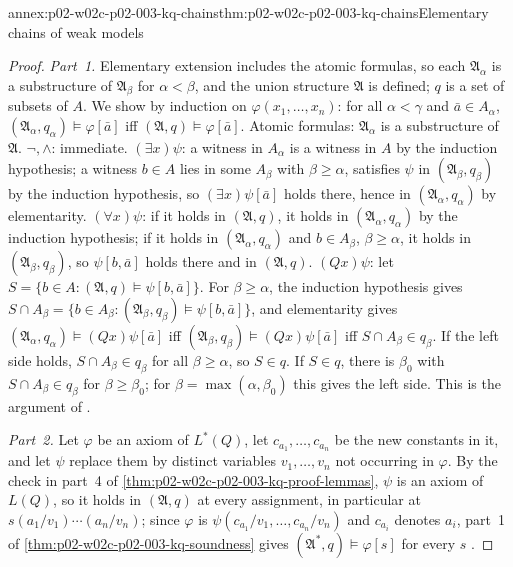 \begin{annexitem}{annex:p02-w02c-p02-003-kq-chains}{thm:p02-w02c-p02-003-kq-chains}{Elementary chains of weak models}
\begin{proof}
\emph{Part~1.}  Elementary extension includes the atomic formulas, so each
\(\mathfrak A_\alpha\) is a substructure of \(\mathfrak A_\beta\) for
\(\alpha<\beta\), and the union structure \(\mathfrak A\) is defined; \(q\)
is a set of subsets of \(A\).  We show by induction on
\(\varphi(x_1,\ldots,x_n)\): for all \(\alpha<\gamma\) and
\(\bar a\in A_\alpha\), \((\mathfrak A_\alpha,q_\alpha)\models\varphi[\bar
a]\) iff \((\mathfrak A,q)\models\varphi[\bar a]\).  Atomic formulas:
\(\mathfrak A_\alpha\) is a substructure of \(\mathfrak A\).  \(\neg,\land\):
immediate.  \((\exists x)\psi\): a witness in \(A_\alpha\) is a witness in
\(A\) by the induction hypothesis; a witness \(b\in A\) lies in some
\(A_\beta\) with \(\beta\ge\alpha\), satisfies \(\psi\) in
\((\mathfrak A_\beta,q_\beta)\) by the induction hypothesis, so
\((\exists x)\psi[\bar a]\) holds there, hence in
\((\mathfrak A_\alpha,q_\alpha)\) by elementarity.  \((\forall x)\psi\):
if it holds in \((\mathfrak A,q)\), it holds in
\((\mathfrak A_\alpha,q_\alpha)\) by the induction hypothesis; if it holds
in \((\mathfrak A_\alpha,q_\alpha)\) and \(b\in A_\beta\), \(\beta\ge\alpha\),
it holds in \((\mathfrak A_\beta,q_\beta)\), so \(\psi[b,\bar a]\) holds
there and in \((\mathfrak A,q)\).  \((Qx)\psi\): let
\(S=\{b\in A:(\mathfrak A,q)\models\psi[b,\bar a]\}\).  For
\(\beta\ge\alpha\), the induction hypothesis gives
\(S\cap A_\beta=\{b\in A_\beta:(\mathfrak A_\beta,q_\beta)\models\psi[b,\bar
a]\}\), and elementarity gives
\((\mathfrak A_\alpha,q_\alpha)\models(Qx)\psi[\bar a]\) iff
\((\mathfrak A_\beta,q_\beta)\models(Qx)\psi[\bar a]\) iff
\(S\cap A_\beta\in q_\beta\).  If the left side holds, \(S\cap A_\beta\in
q_\beta\) for all \(\beta\ge\alpha\), so \(S\in q\).  If \(S\in q\), there is
\(\beta_0\) with \(S\cap A_\beta\in q_\beta\) for \(\beta\ge\beta_0\); for
\(\beta=\max(\alpha,\beta_0)\) this gives the left side.  This is the
argument of \cite[\S2, Lemma~2.5, pp.~17--18]{Keisler1970}.

\emph{Part~2.}  Let \(\varphi\) be an axiom of \(L^{*}(Q)\), let
\(c_{a_1},\ldots,c_{a_n}\) be the new constants in it, and let \(\psi\)
replace them by distinct variables \(v_1,\ldots,v_n\) not occurring in
\(\varphi\).  By the check in part~4 of
\cref{thm:p02-w02c-p02-003-kq-proof-lemmas}, \(\psi\) is an axiom of
\(L(Q)\), so it holds in \((\mathfrak A,q)\) at every assignment, in
particular at \(s(a_1/v_1)\cdots(a_n/v_n)\); since \(\varphi\) is
\(\psi(c_{a_1}/v_1,\ldots,c_{a_n}/v_n)\) and \(c_{a_i}\) denotes \(a_i\),
part~1 of \cref{thm:p02-w02c-p02-003-kq-soundness} gives
\((\mathfrak A^{*},q)\models\varphi[s]\) for every \(s\)
\cite[\S2, Lemma~2.6, p.~18]{Keisler1970}.


\end{proof}
\end{annexitem}
